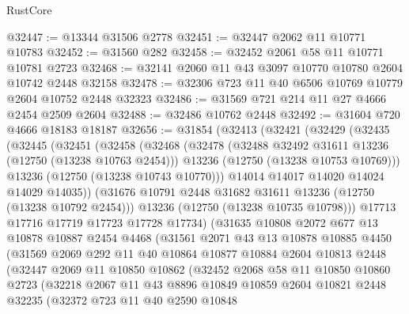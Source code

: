 \begin{lexlean}{RustCore}
\begin{coremodule}
@32447 := @13344 @31506 @2778
@32451 := @32447 @2062 @11 @10771 @10783
@32452 := @31560 @282
@32458 := @32452 @2061 @58 @11 @10771 @10781 @2723
@32468 := @32141 @2060 @11 @43 @3097 @10770 @10780 @2604 @10742 @2448 @32158
@32478 := @32306 @723 @11 @40 @6506 @10769 @10779 @2604 @10752 @2448 @32323
@32486 := @31569 @721 @214 @11 @27 @4666 @2454 @2509 @2604
@32488 := @32486 @10762 @2448
@32492 := @31604 @720 @4666 @18183 @18187
@32656 := @31854
    (@32413
      (@32421
        (@32429
          (@32435
            (@32445
              (@32451
                (@32458
                  (@32468
                    (@32478
                      (@32488 @32492 @31611 @13236 (@12750 (@13238 @10763 @2454)))
                      @13236
                      (@12750 (@13238 @10753 @10769)))
                    @13236
                    (@12750 (@13238 @10743 @10770)))
                  @14014
                  @14017
                  @14020
                  @14024
                  @14029
                  @14035))
              (@31676 @10791 @2448 @31682 @31611 @13236 (@12750 (@13238 @10792 @2454)))
              @13236
              (@12750 (@13238 @10735 @10798)))
            @17713
            @17716
            @17719
            @17723
            @17728
            @17734)
          (@31635
            @10808
            @2072
            @677
            @13
            @10878
            @10887
            @2454
            @4468
            (@31561
              @2071
              @43
              @13
              @10878
              @10885
              @4450
              (@31569
                @2069
                @292
                @11
                @40
                @10864
                @10877
                @10884
                @2604
                @10813
                @2448
                (@32447
                  @2069
                  @11
                  @10850
                  @10862
                  (@32452
                    @2068
                    @58
                    @11
                    @10850
                    @10860
                    @2723
                    (@32218
                      @2067
                      @11
                      @43
                      @8896
                      @10849
                      @10859
                      @2604
                      @10821
                      @2448
                      @32235
                      (@32372
                        @723
                        @11
                        @40
                        @2590
                        @10848

\end{coremodule}
\end{lexlean}
